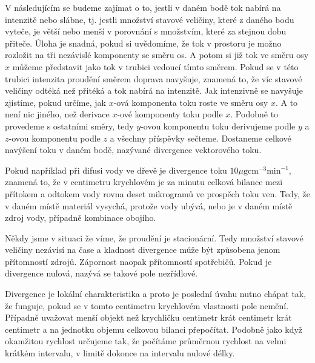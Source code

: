 \documentclass[12pt]{article}
\begin{document}
V následujícím se budeme zajímat o to, jestli v daném bodě tok nabírá na intenzitě nebo slábne, tj. jestli množství stavové veličiny, které z daného bodu vyteče, je větší nebo menší v porovnání s množstvím, které za stejnou dobu přiteče. Úloha je snadná, pokud si uvědomíme, že tok v prostoru je možno rozložit na tři nezávislé komponenty se směru os. A potom si již tok ve směru osy $x$ můžeme představit jako tok v trubici vedoucí tímto směrem. Pokud se v této trubici intenzita proudění směrem doprava navyšuje, znamená to, že víc stavové veličiny odtéká než přitéká a tok nabírá na intenzitě. Jak intenzivně se navyšuje zjistíme, pokud určíme, jak $x$-ová komponenta toku roste ve směru osy $x$. A to není nic jiného, než derivace $x$-ové komponenty toku podle $x$. Podobně to provedeme s ostatními směry, tedy $y$-ovou komponentu toku derivujeme podle $y$ a $z$-ovou komponentu podle $z$ a všechny příspěvky sečteme. Dostaneme celkové navýšení toku v daném bodě, nazývané divergence vektorového toku. 

Pokud například při difusi vody ve dřevě je divergence toku $10\mu \mathrm g \mathrm {cm}^{-3} \mathrm {min}^{-1}$, znamená to, že v centimetru krychlovém je za minutu celková bilance mezi přítokem a odtokem vody rovna deset mikrogramů ve prospěch toku ven. Tedy, že v daném místě materiál vysychá, protože vody ubývá, nebo je v daném místě zdroj vody, případně kombinace obojího. 

Někdy jsme v situaci že víme, že proudění je stacionární. Tedy množství stavové veličiny nezávisí na čase a kladnost divergence může být způsobena jenom přítomností zdrojů. Zápornost naopak přítomností spotřebičů. Pokud je divergence nulová, nazývá se takové pole nezřídlové.

Divergence je lokální charakteristika a proto je poslední úvahu nutno chápat tak, že funguje, pokud se v tomto centimetru krychlovém vlastnosti pole nemění. Případně uvažovat menší objekt než krychličku centimetr krát centimetr krát centimetr a na jednotku objemu celkovou bilanci přepočítat. Podobně jako když okamžitou rychlost určujeme tak, že počítáme průměrnou rychlost na velmi krátkém intervalu, v limitě dokonce na intervalu nulové délky.
\end{document}
